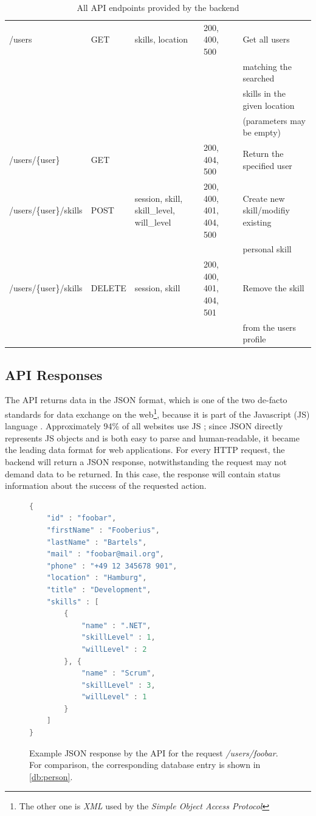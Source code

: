 \begin{table}[p]
{\begin{tabular}{l|l|l|l|l}
  /users               & GET    & skills, location                            & 200, 400, 500           & Get all users\\ & & & &  matching the searched\\ & & & & skills in the given location\\ & & & & (parameters may be empty)\\ \hline
  /users/\{user\}        & GET    &                                             & 200, 404, 500           & Return the specified user\\ \hline
  /users/\{user\}/skills & POST   & session, skill, skill\_level, will\_level & 200, 400, 401, 404, 500 & Create new skill/modifiy existing\\ & & & & personal skill\\ \hline
  /users/\{user\}/skills & DELETE & session, skill                              & 200, 400, 401, 404, 501 & Remove the skill\\ & & & & from the users profile\\
  \end{tabular}
  }
\caption[API Endpoints]{All API endpoints provided by the backend}
\label{swaggertable}
\end{table}
\newpage

\subsection{API Responses}
The API returns data in the JSON format, which is one of the two de-facto standards for data exchange on the web\footnote{The other one is \textit{XML} used by the \textit{Simple Object Access Protocol}}, because it is part of the Javascript (JS) language \cite[p. 37]{json}. Approximately 94\% of all websites use JS \cite{jsmarket}; since JSON directly represents JS objects and is both easy to parse and human-readable, it became the leading data format for web applications.
For every HTTP request, the backend will return a JSON response, notwithstanding the request may not demand data to be returned. In this case, the response will contain status information about the success of the requested action.

\begin{figure}[h]
\begin{lstlisting}[language=Java]
{
	"id" : "foobar",
	"firstName" : "Fooberius",
	"lastName" : "Bartels",
	"mail" : "foobar@mail.org",
	"phone" : "+49 12 345678 901",
	"location" : "Hamburg",
	"title" : "Development",
	"skills" : [
		{
			"name" : ".NET",
			"skillLevel" : 1,
			"willLevel" : 2
		}, {
			"name" : "Scrum",
			"skillLevel" : 3,
			"willLevel" : 1
		}
	]
}
\end{lstlisting}
\caption[Person API Response]{Example JSON response by the API for the request \textit{/users/foobar}. For comparison, the corresponding database entry is shown in \ref{db:person}.}
\end{figure}


